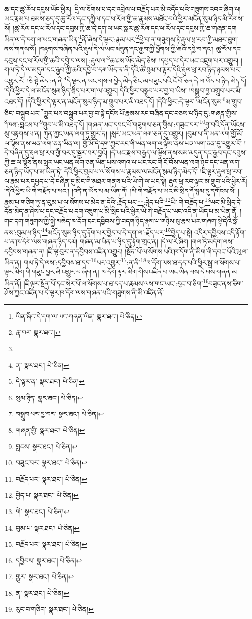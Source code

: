 ཆ་དང་ཚུ་རོལ་དབུས་ཡོད་ཕྱིར། །དྲི་ལ་སོགས་པ་དང་འབྲེལ་པ་བརྗོད་པར་མི་འདོད་པའི་གཟུགས་འབའ་ཞིག་ལ། ཡང་རྣམ་པ་ཐམས་ཅད་དུ་ཚུ་རོལ་དང་དཀྱིལ་དང་ཕ་རོལ་གྱི་ཆ་རྣམས་མཐོང་བའི་ཕྱིར་མངོན་སུམ་ཉིད་མི་རིགས་སོ། །ཚུ་རོལ་དང་ཕ་རོལ་དང་དབུས་ཀྱི་ཆ་དེ་དག་ལ་ཡང་སླར་ཚུ་རོལ་དང་ཕ་རོལ་དང་དབུས་ཀྱི་ཆ་གཞན་དག་ཡིན་ལ་དེ་དག་ལ་ཡང་གཞན་ཡིན་\footnote{ཡིན་ཞིང་དེ་དག་ལ་ཡང་གཞན་ཡིན་  སྣར་ཐང་།  པེ་ཅིན། }ནོ་ཞེས་དེ་ལྟར་:རྣམ་པར་\footnote{རྣ་བར་  སྣར་ཐང་། }ཕྱེ་བ་ན་གཟུགས་ཏེ་རྡུལ་ཕྲ་རབ་ཀྱི་མཐར་ཐུག་ནས་གནས་སོ། །བརྟགས་བཞིན་པའི་རྡུལ་དེ་ལ་ཡང་མདུན་དང་རྒྱབ་ཀྱི་ཕྱོགས་ཀྱི་ཆའི་དབྱེ་བ་དང་། ཚུ་རོལ་དང་དབུས་དང་ཕ་རོལ་གྱི་ཆའི་དབྱེ་བ་ལས། :རྡུལ་ལ་\footnote{}ཆ་ཤས་ཡོད་མེད་ཅེས། །དཔྱད་པ་དེར་ཡང་འཇུག་པར་འགྱུར། །གལ་ཏེ་དེ་ལ་མདུན་དང་རྒྱབ་ཀྱི་ཆའི་དབྱེ་བ་དག་ཡོད་ན་ནི་དེའི་ཚེ་བུམ་པ་ལྟར་དེའི་རྡུལ་ཕྲ་རབ་ཉིད་ཉམས་པར་འགྱུར་རོ། །ཅི་སྟེ་མེད་:ན་ནི་\footnote{ན་  སྣར་ཐང་།  པེ་ཅིན། }དེ་ལྟར་ན་ཡང་གསལ་བྱེད་མེད་ཅིང་མ་བཟུང་བའི་ངོ་བོ་ཅན་དེ་ལ་ཡོད་པ་ཉིད་མེད་དོ། །དེའི་ཕྱིར་དེ་ལ་མངོན་སུམ་ཉིད་སྲིད་པར་ག་ལ་འགྱུར། དེའི་ཕྱིར་བསྒྲུབ་པར་བྱ་བ་ཡིས། །བསྒྲུབ་བྱ་འགྲུབ་པར་མི་འཐད་དོ། །དེའི་ཕྱིར་དེ་ལྟར་ན་མངོན་སུམ་ཉིད་མ་གྲུབ་པར་མི་འཐད་དོ། །དེའི་ཕྱིར་:དེ་ལྟར་\footnote{དེ་ལྟར་ན་  སྣར་ཐང་།  པེ་ཅིན། }མངོན་སུམ་\footnote{སུམ་ཉིད་  སྣར་ཐང་།  པེ་ཅིན། }མ་གྲུབ་ཅིང་:བསྒྲུབ་པར་\footnote{བསྒྲུབ་པར་བྱ་བར་  སྣར་ཐང་།  པེ་ཅིན། }གྱུར་པས་བསྒྲུབ་པར་བྱ་བ་སྟེ་དངོས་པོ་རྣམས་རང་བཞིན་དང་བཅས་པ་ཉིད་དུ་:གཞན་གྱིས་\footnote{གཞན་གྱི་  སྣར་ཐང་།  པེ་ཅིན། }ཁས་:བླངས་པ་\footnote{བླངས་  སྣར་ཐང་།  པེ་ཅིན། }གྲུབ་པ་མི་འཐད་དོ། །གཞན་ཡང་དབང་པོ་གཟུགས་ཅན་གྱིས་:གཟུང་བར་\footnote{བཟུང་བར་  སྣར་ཐང་།  པེ་ཅིན། }བྱ་བའི་དོན་ཡོངས་སུ་བརྟགས་པ་ན། ཀུན་ཀྱང་ཡན་ལག་ཏུ་གྱུར་ན། །སླར་ཡང་ཡན་ལག་ཅན་དུ་འགྱུར། །བུམ་པ་ནི་ཡན་ལག་གྱོ་མོ་ལ་ལྟོས་ནས་ཡན་ལག་ཅན་ཡིན་ལ། གྱོ་མོ་དེ་དག་ཀྱང་རང་གི་ཡན་ལག་ལ་ལྟོས་ནས་ཡན་ལག་ཅན་དུ་འགྱུར་རོ། །དེ་བཞིན་དུ་རྡུལ་ཕྲ་རབ་ཀྱི་བར་དུ་སྦྱར་བར་བྱའོ། །དེ་ཡང་རྫས་བརྒྱད་ལ་ལྟོས་ནས་སམ་མདུན་དང་རྒྱབ་དང་དབུས་ཀྱི་ཆ་ལ་ལྟོས་ནས་སླར་ཡང་ཡན་ལག་ཅན་ཡིན་པས་འགའ་ལ་ཡང་རང་གི་ངོ་བོས་ཡན་ལག་ཉིད་དང་ཡན་ལག་ཅན་ཉིད་ཡོད་པ་མ་ཡིན་ཏེ། དེའི་ཕྱིར་བུམ་པ་ལ་སོགས་པ་རྣམས་ལ་མངོན་སུམ་ཉིད་མེད་དོ། །ཇི་ལྟར་རྡུལ་ཕྲ་རབ་ལ་རྣམ་པར་དཔྱད་པ་དེ་བཞིན་དུ་མིང་གི་མཐར་གནས་པའི་ཡི་གེ་ལ་ཡང་སྟེ། རྡུལ་ཕྲ་རབ་ལྟར་མ་གྲུབ་པའི་ཕྱིར་རོ། །དེའི་ཕྱིར་ཡི་གེ་བརྗོད་པ་ཡང་། །འདི་ན་ཡོད་པ་མ་ཡིན་ནོ། །ཡི་གེ་བརྗོད་པ་ཡང་མི་སྲིད་དོ་སྙམ་དུ་དགོངས་སོ། །རྣམ་པ་གཅིག་ཏུ་ན་བུམ་པ་ལ་སོགས་པ་མེད་ན་དེའི་:རྗོད་པར་\footnote{བརྗོད་པར་  སྣར་ཐང་།  པེ་ཅིན། }:བྱེད་པའི་\footnote{བྱེད་པ་  སྣར་ཐང་།  པེ་ཅིན། }ཡི་:གེ་བརྗོད་པ་\footnote{གེ་  སྣར་ཐང་།  པེ་ཅིན། }ཡང་མི་སྲིད་དེ། དོན་མེད་ན་ཤེས་པ་དང་བརྗོད་པ་དག་འཇུག་པ་མི་སྲིད་པའི་ཕྱིར་ཡི་གེ་བརྗོད་པ་ཡང་འདི་ན་ཡོད་པ་མ་ཡིན་ནོ། །གང་དག་གཟུགས་ཀྱི་སྐྱེ་མཆེད་ཁ་དོག་དང་དབྱིབས་ཀྱི་བདག་ཉིད་རྣམ་པ་གཉིས་སུ་རྣམ་པར་གཞག་སྟེ་དེའི་སྒོ་ནས་:བུམ་པ་ཉིད་\footnote{བུམ་པ་  སྣར་ཐང་།  པེ་ཅིན། }མངོན་སུམ་ཉིད་དུ་རྟོག་པར་བྱེད་པ་དེ་དག་ལ་:རྗོད་པར་\footnote{བརྗོད་པར་  སྣར་ཐང་།  པེ་ཅིན། }བྱེད་པ་སྟེ། འདིར་དབྱིབས་འདི་རྟོག་པ་ན་ཁ་དོག་ལས་གཞན་ཉིད་དམ། གཞན་མ་ཡིན་པ་ཉིད་དུ་རྟོག་གྲང་ན། །དེ་ལ་རེ་ཞིག །གལ་ཏེ་མདོག་ལས་དབྱིབས་གཞན་ན། །ཇི་ལྟ་བུར་ན་དབྱིབས་འཛིན་འགྱུར། །སྔོན་པོ་ལ་སོགས་པའི་ཁ་དོག་ནི་མིག་གི་དབང་པོའི་ཡུལ་ཡིན་ན། གལ་ཏེ་དེ་ལས་:དབྱིབས་ཐ་དད་\footnote{དབྱིབས་  སྣར་ཐང་།  པེ་ཅིན། }པར་འགྱུར་\footnote{གྱུར་  སྣར་ཐང་།  པེ་ཅིན། }:ན་ནི་\footnote{ན་  སྣར་ཐང་།  པེ་ཅིན། }ཁ་དོག་ལས་ཐ་དད་པའི་ཕྱིར་སྒྲ་ལ་སོགས་པ་ལྟར་མིག་གི་གཟུང་བྱར་མི་འགྱུར་བ་ཞིག་ན། ཁ་དོག་ལྟར་མིག་གིས་འཛིན་པ་ཡང་ཡིན་པས་དེ་ལས་གཞན་མ་ཡིན་ནོ། །ཇི་ལྟར་སྔོན་པོ་དང་སེར་པོ་ལ་སོགས་པ་ཐ་དད་པ་རྣམས་ལས་གང་ཡང་:རུང་བ་ཅིག་\footnote{རུང་བ་གཅིག་  སྣར་ཐང་།  པེ་ཅིན། }བཟུང་ནས་ཅིག་ཤོས་ཀྱང་འཛིན་པ་དེ་ལྟར་ཁ་དོག་ལས་གཞན་པའི་གཟུགས་ནི་མི་འཛིན་ནོ། 